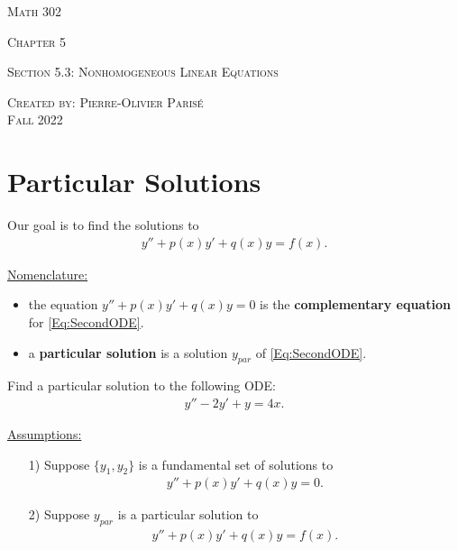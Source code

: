 \documentclass[12pt,a4paper]{article}
\newcounter{example}[section]
\begin{document}
\thispagestyle{empty}

\begin{center}
\vspace*{2.5cm}

{\Huge \textsc{Math 302}}

\vspace*{2cm}

{\LARGE \textsc{Chapter 5}} 

\vspace*{0.75cm}

\noindent\textsc{Section 5.3: Nonhomogeneous Linear Equations}

\vspace*{0.75cm}

\tableofcontents

\vfill

\noindent \textsc{Created by: Pierre-Olivier Paris{\'e}} \\
\textsc{Fall 2022}
\end{center}

\newpage

\section{Particular Solutions}

Our goal is to find the solutions to
	\begin{align}
	y'' + p(x)y' + q(x) y = f(x) . \label{Eq:SecondODE}
	\end{align}
	
\underline{Nomenclature:}
	\begin{itemize}
	\item the equation $y'' + p(x) y' + q(x) y = 0$ is the \textbf{complementary equation} for \eqref{Eq:SecondODE}.
	\item a \textbf{particular solution} is a solution $y_{par}$ of \eqref{Eq:SecondODE}.
	\end{itemize}
	
\vspace*{16pt}

\begin{example}
Find a particular solution to the following ODE:
	\begin{align*}
	y'' - 2y' + y = 4x .
	\end{align*}
\end{example}

\newpage

\underline{Assumptions:}

	\begin{itemize}
	\item[1)] Suppose $\{ y_1 , y_2 \}$ is a fundamental set of solutions to
		\begin{align*}
		y'' + p(x) y' + q(x) y = 0 .
		\end{align*}
	\item[2)] Suppose $y_{par}$ is a particular solution to
		\begin{align*}
		y'' + p(x) y' + q(x) y = f(x) .
		\end{align*}
	\end{itemize}
\end{document}
